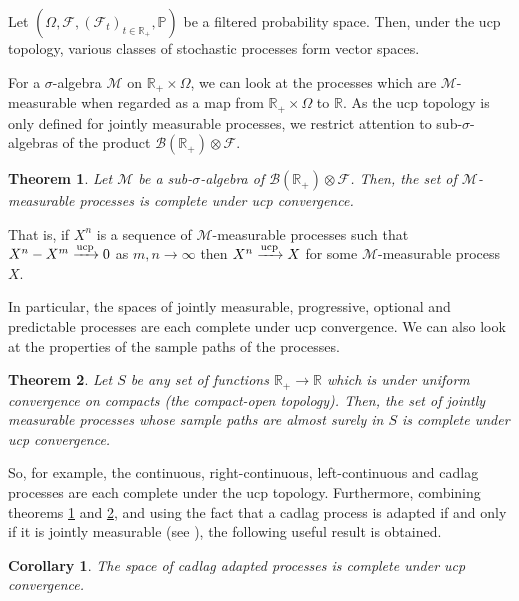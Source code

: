 \documentclass[12pt]{article}
\newtheorem*{corollary*}{Corollary}
\newtheorem{theorem}{Theorem}
\begin{document}

Let $(\Omega,\mathcal{F},(\mathcal{F}_t)_{t\in\mathbb{R}_+},\mathbb{P})$ be a filtered probability space. Then, under the ucp topology, various classes of stochastic processes form  vector spaces.

For a $\sigma$-algebra $\mathcal{M}$ on $\mathbb{R}_+\times\Omega$, we can look at the processes which are $\mathcal{M}$-measurable when regarded as a map from $\mathbb{R}_+\times\Omega$ to $\mathbb{R}$. As the ucp topology is only defined for jointly measurable processes, we restrict attention to sub-$\sigma$-algebras of the product $\mathcal{B}(\mathbb{R}_+)\otimes\mathcal{F}$.

\begin{theorem}\label{measurable}
Let $\mathcal{M}$ be a sub-$\sigma$-algebra of $\mathcal{B}(\mathbb{R}_+)\otimes\mathcal{F}$. Then, the set of $\mathcal{M}$-measurable processes is complete under ucp convergence.
\end{theorem}

That is, if $X^n$ is a sequence of $\mathcal{M}$-measurable processes such that $X^n-X^m\xrightarrow{\rm ucp} 0$ as $m,n\rightarrow\infty$ then $X^n\xrightarrow{\rm ucp} X$ for some $\mathcal{M}$-measurable process $X$.

In particular, the spaces of jointly measurable, progressive, optional and predictable processes are each complete under ucp convergence.
We can also look at the properties of the sample paths of the processes.

\begin{theorem}\label{paths}
Let $S$ be any set of functions $\mathbb{R}_+\rightarrow\mathbb{R}$ which is  under uniform convergence on compacts (the compact-open topology). Then, the set of jointly measurable processes whose sample paths are almost surely in $S$ is complete under ucp convergence.
\end{theorem}

So, for example, the continuous, right-continuous, left-continuous and cadlag processes are each complete under the ucp topology. Furthermore, combining theorems \ref{measurable} and \ref{paths}, and using the fact that a cadlag process is adapted if and only if it is jointly measurable (see ), the following useful result is obtained.

\begin{corollary*}
The space of cadlag adapted processes is complete under ucp convergence.
\end{corollary*}

\end{document}

